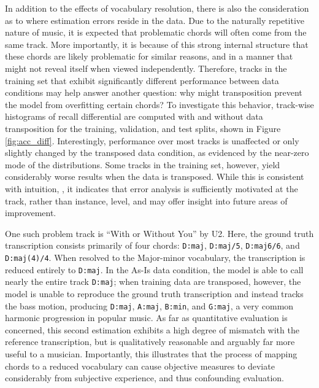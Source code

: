 In addition to the effects of vocabulary resolution, there is also the consideration as to where estimation errors reside in the data.
Due to the naturally repetitive nature of music, it is expected that problematic chords will often come from the same track.
More importantly, it is because of this strong internal structure that these chords are likely problematic for similar reasons, and in a manner that might not reveal itself when viewed independently.
Therefore, tracks in the training set that exhibit significantly different performance between data conditions may help answer another question: why might transposition prevent the model from overfitting certain chords?
To investigate this behavior, track-wise histograms of recall differential are computed with and without data transposition for the training, validation, and test splits, shown in Figure \ref{fig:acc_diff}.
Interestingly, performance over most tracks is unaffected or only slightly changed by the transposed data condition, as evidenced by the near-zero mode of the distributions.
Some tracks in the training set, however, yield considerably worse results when the data is transposed.
While this is consistent with intuition, %
, it indicates that error analysis is sufficiently motivated at the track, rather than instance, level, and may offer insight into future areas of improvement.

One such problem track is ``With or Without You'' by U2.
Here, the ground truth transcription consists primarily of four chords: \texttt{D:maj}, \texttt{D:maj/5}, \texttt{D:maj6/6}, and \texttt{D:maj(4)/4}.
When resolved to the Major-minor vocabulary, the transcription is reduced entirely to \texttt{D:maj}.
In the As-Is data condition, the model is able to call nearly the entire track \texttt{D:maj};
when training data are transposed, however, the model is unable to reproduce the ground truth transcription and instead tracks the bass motion, producing \texttt{D:maj}, \texttt{A:maj}, \texttt{B:min}, and \texttt{G:maj}, a very common harmonic progression in popular music.
As far as quantitative evaluation is concerned, this second estimation exhibits a high degree of mismatch with the reference transcription, but is qualitatively reasonable and arguably far more useful to a musician.
Importantly, this illustrates that the process of mapping chords to a reduced vocabulary can cause objective measures to deviate considerably from subjective experience, and thus confounding evaluation.

